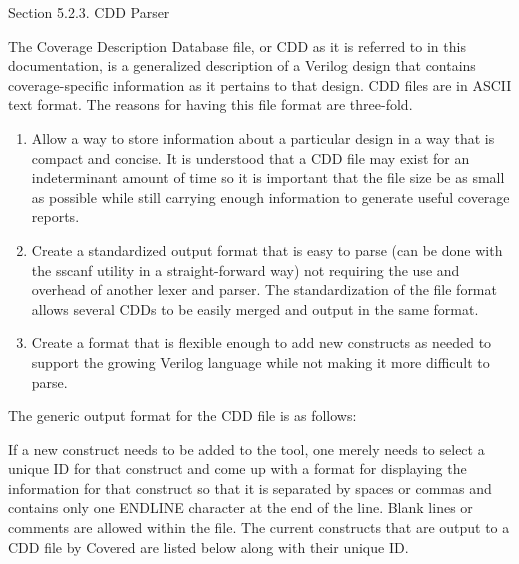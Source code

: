 \begin{Desc}
\item[Section 5.2.3. CDD Parser]\end{Desc}
\begin{Desc}
\item[]The Coverage Description Database file, or CDD as it is referred to in this documentation, is a generalized description of a Verilog design that contains coverage-specific information as it pertains to that design. CDD files are in ASCII text format. The reasons for having this file format are three-fold.\end{Desc}
\begin{Desc}
\item[]\begin{enumerate}
\item Allow a way to store information about a particular design in a way that is compact and concise. It is understood that a CDD file may exist for an indeterminant amount of time so it is important that the file size be as small as possible while still carrying enough information to generate useful coverage reports. \item Create a standardized output format that is easy to parse (can be done with the sscanf utility in a straight-forward way) not requiring the use and overhead of another lexer and parser. The standardization of the file format allows several CDDs to be easily merged and output in the same format. \item Create a format that is flexible enough to add new constructs as needed to support the growing Verilog language while not making it more difficult to parse. \end{enumerate}
\end{Desc}
\begin{Desc}
\item[]The generic output format for the CDD file is as follows:\end{Desc}
\begin{Desc}
\item[]{\tt }  {\tt } \end{Desc}
\begin{Desc}
\item[]If a new construct needs to be added to the tool, one merely needs to select a unique ID for that construct and come up with a format for displaying the information for that construct so that it is separated by spaces or commas and contains only one ENDLINE character at the end of the line. Blank lines or comments are allowed within the file. The current constructs that are output to a CDD file by Covered are listed below along with their unique ID.\end{Desc}
